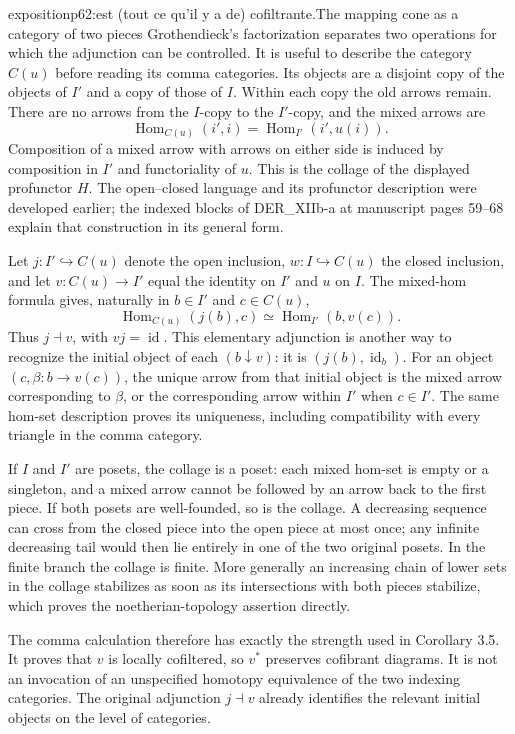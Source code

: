 \begin{dcomment}{exposition}{p62:est (tout ce qu'il y a de) cofiltrante.}{The mapping cone as a category of two pieces}
Grothendieck's factorization separates two operations for which the adjunction can be controlled. It is useful to describe the category $C(u)$ before reading its comma categories. Its objects are a disjoint copy of the objects of $I'$ and a copy of those of $I$. Within each copy the old arrows remain. There are no arrows from the $I$-copy to the $I'$-copy, and the mixed arrows are
\[
 \operatorname{Hom}_{C(u)}(i',i)
      =\operatorname{Hom}_{I'}(i',u(i)).
\]
Composition of a mixed arrow with arrows on either side is induced by composition in $I'$ and functoriality of $u$. This is the collage of the displayed profunctor $H$. The open--closed language and its profunctor description were developed earlier; the indexed blocks of DER\_XIIb-a at manuscript pages 59--68 explain that construction in its general form.

Let $j:I'\hookrightarrow C(u)$ denote the open inclusion, $w:I\hookrightarrow C(u)$ the closed inclusion, and let $v:C(u)\to I'$ equal the identity on $I'$ and $u$ on $I$. The mixed-hom formula gives, naturally in $b\in I'$ and $c\in C(u)$,
\[
 \operatorname{Hom}_{C(u)}(j(b),c)
       \simeq\operatorname{Hom}_{I'}(b,v(c)).
\]
Thus $j\dashv v$, with $vj=\operatorname{id}$. This elementary adjunction is another way to recognize the initial object of each $(b\downarrow v)$: it is $(j(b),\operatorname{id}_b)$. For an object $(c,\beta:b\to v(c))$, the unique arrow from that initial object is the mixed arrow corresponding to $\beta$, or the corresponding arrow within $I'$ when $c\in I'$. The same hom-set description proves its uniqueness, including compatibility with every triangle in the comma category.

If $I$ and $I'$ are posets, the collage is a poset: each mixed hom-set is empty or a singleton, and a mixed arrow cannot be followed by an arrow back to the first piece. If both posets are well-founded, so is the collage. A decreasing sequence can cross from the closed piece into the open piece at most once; any infinite decreasing tail would then lie entirely in one of the two original posets. In the finite branch the collage is finite. More generally an increasing chain of lower sets in the collage stabilizes as soon as its intersections with both pieces stabilize, which proves the noetherian-topology assertion directly.

The comma calculation therefore has exactly the strength used in Corollary 3.5. It proves that $v$ is locally cofiltered, so $v^*$ preserves cofibrant diagrams. It is not an invocation of an unspecified homotopy equivalence of the two indexing categories. The original adjunction $j\dashv v$ already identifies the relevant initial objects on the level of categories.
\end{dcomment}

